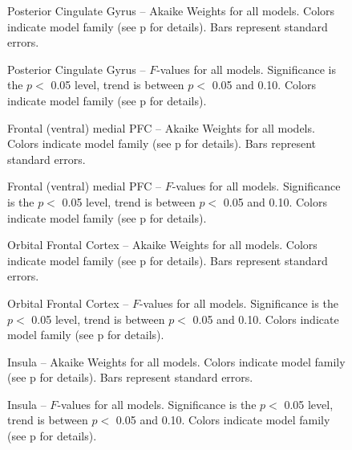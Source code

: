 \documentclass[doc,12pt]{apa}        %
\begin{document}
\begin{figure}[tp]
    \centering
    \caption{Posterior Cingulate Gyrus -- Akaike Weights for all models.  Colors indicate model family (see p\pageref{sub:cmb} for details). Bars represent standard errors.}
	\label{fig:post}
\end{figure}
\begin{figure}[tp]
    \centering
    \caption{Posterior Cingulate Gyrus -- $F$-values for all models.  Significance is the $p <$ 0.05 level, trend is between $p <$ 0.05 and 0.10.  Colors indicate model family (see p\pageref{sub:cmb} for details).}
	\label{fig:fvalpost}
\end{figure}


\begin{figure}[tp]
    \centering
    \caption{Frontal (ventral) medial PFC -- Akaike Weights for all models.  Colors indicate model family (see p\pageref{sub:cmb} for details). Bars represent standard errors.}
	\label{fig:vmpfc}
\end{figure}
\begin{figure}[tp]
    \centering
    \caption{Frontal (ventral) medial PFC -- $F$-values for all models.  Significance is the $p <$ 0.05 level, trend is between $p <$ 0.05 and 0.10.  Colors indicate model family (see p\pageref{sub:cmb} for details).}
	\label{fig:fvalvmpfc}
\end{figure}


\begin{figure}[tp]
    \centering
    \caption{Orbital Frontal Cortex -- Akaike Weights for all models.  Colors indicate model family (see p\pageref{sub:cmb} for details). Bars represent standard errors.}
	\label{fig:ofc}
\end{figure}
\begin{figure}[tp]
    \centering
    \caption{Orbital Frontal Cortex -- $F$-values for all models.  Significance is the $p <$ 0.05 level, trend is between $p <$ 0.05 and 0.10.  Colors indicate model family (see p\pageref{sub:cmb} for details).}
	\label{fig:fvalofc}
\end{figure}


\begin{figure}[tp]
    \centering
    \caption{Insula -- Akaike Weights for all models.  Colors indicate model family (see p\pageref{sub:cmb} for details). Bars represent standard errors.}
	\label{fig:insula}
\end{figure}
\begin{figure}[tp]
    \centering
    \caption{Insula -- $F$-values for all models.  Significance is the $p <$ 0.05 level, trend is between $p <$ 0.05 and 0.10.  Colors indicate model family (see p\pageref{sub:cmb} for details).}
	\label{fig:fvalinsula}
\end{figure}
\end{document}
